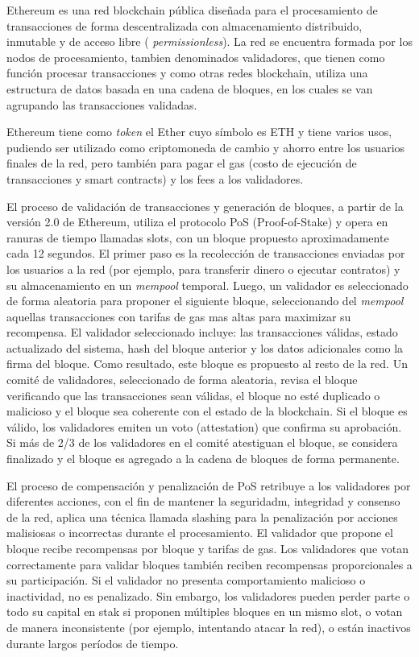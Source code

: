 Ethereum es una red blockchain pública diseñada para el procesamiento de transacciones de forma descentralizada con almacenamiento distribuido, inmutable y de acceso libre ( \textit{permissionless}). La red se encuentra formada por los nodos de procesamiento, tambien denominados validadores, que tienen como función procesar transacciones y como otras redes blockchain, utiliza una estructura de datos basada en una cadena de bloques, en los cuales se van agrupando las transacciones validadas. 

Ethereum tiene como \textit{token} el Ether cuyo símbolo es ETH y tiene varios usos, pudiendo ser utilizado como criptomoneda de cambio y ahorro entre los usuarios finales de la red, pero también para pagar el gas (costo de ejecución de transacciones y smart contracts) y los fees a los validadores.

El proceso de validación de transacciones y generación de bloques, a partir de la versión 2.0 de Ethereum, utiliza el protocolo PoS (Proof-of-Stake) y opera en ranuras de tiempo llamadas slots, con un bloque propuesto aproximadamente cada 12 segundos. El primer paso es la recolección de transacciones enviadas por los usuarios a la red (por ejemplo, para transferir dinero o ejecutar contratos) y su almacenamiento en un \textit{mempool} temporal. Luego, un validador es seleccionado de forma aleatoria para proponer el siguiente bloque, seleccionando del \textit{mempool} aquellas transacciones con tarifas de gas mas altas para maximizar su recompensa. El validador seleccionado incluye: las transacciones válidas, estado actualizado del sistema, hash del bloque anterior y los datos adicionales como la firma del bloque. Como resultado, este bloque es propuesto al resto de la red. Un comité de validadores, seleccionado de forma aleatoria, revisa el bloque verificando que las transacciones sean válidas, el bloque no esté duplicado o malicioso y el bloque sea coherente con el estado de la blockchain. Si el bloque es válido, los validadores emiten un voto (attestation) que confirma su aprobación. Si más de 2/3 de los validadores en el comité atestiguan el bloque, se considera finalizado y el bloque es agregado a la cadena de bloques de forma permanente.

El proceso de compensación y penalización de PoS retribuye a los validadores por diferentes acciones, con el fin de mantener la seguridadm, integridad y consenso de la red, aplica una técnica llamada slashing para la penalización por acciones malisiosas o incorrectas durante el procesamiento. El validador que propone el bloque recibe recompensas por bloque y tarifas de gas. Los validadores que votan correctamente para validar bloques también reciben recompensas proporcionales a su participación. Si el validador no presenta comportamiento malicioso o inactividad, no es penalizado. Sin embargo, los validadores pueden perder parte o todo su capital en stak si proponen múltiples bloques en un mismo slot, o votan de manera inconsistente (por ejemplo, intentando atacar la red), o están inactivos durante largos períodos de tiempo.

